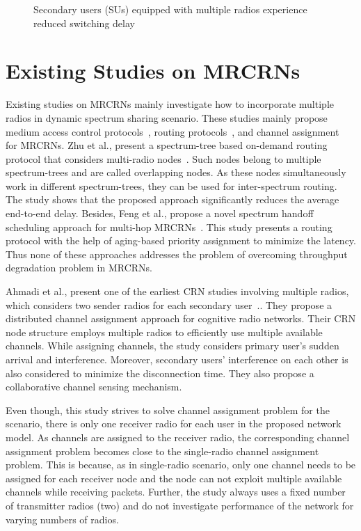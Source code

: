 \begin{figure}[!htbp]
\begin{center}
    
    \caption{Secondary users (SUs) equipped with multiple radios experience reduced switching delay}
    \label{fig:switchingDelay}
\end{center}
\end{figure}


\section{Existing Studies on MRCRNs}
Existing studies on MRCRNs mainly investigate how to incorporate multiple radios in dynamic spectrum sharing scenario. These studies mainly propose medium access control protocols~\cite{cormio2009survey, de2012survey}, routing protocols~\cite{zhu2008stod, feng2009joint}, and channel assignment~\cite{ahmadi2012distributed, zhong2014capacity} for MRCRNs. Zhu et al., present a spectrum-tree based on-demand routing protocol that considers multi-radio nodes~\cite{zhu2008stod}. Such nodes belong to multiple spectrum-trees and are called overlapping nodes. As these nodes simultaneously work in different spectrum-trees, they can be used for inter-spectrum routing. The study shows that the proposed approach significantly reduces the average end-to-end delay.  Besides, Feng et al., propose a novel spectrum handoff scheduling approach for multi-hop MRCRNs~\cite{feng2009joint}. This study presents a routing protocol with the help of aging-based priority assignment to minimize the latency. Thus none of these approaches addresses the problem of overcoming throughput degradation problem in MRCRNs.

Ahmadi et al., present one of the earliest CRN studies involving multiple radios, which considers two sender radios for each secondary user~\cite{ahmadi2012distributed}.. They propose a distributed channel assignment approach for cognitive radio networks. Their CRN node structure employs multiple radios to efficiently use multiple available channels. While assigning channels, the study considers primary user's sudden arrival and interference. Moreover, secondary users' interference on each other is also considered to minimize the disconnection time. They also propose a collaborative channel sensing mechanism.

Even though, this study strives to solve channel assignment problem for the scenario, there is only one receiver radio for each user in the proposed network model. As channels are assigned to the receiver radio, the corresponding channel assignment problem becomes close to the single-radio channel assignment problem. This is because, as in single-radio scenario, only one channel needs to be assigned for each receiver node and the node can not exploit multiple available channels while receiving packets. Further, the study always uses a fixed number of transmitter radios (two) and do not investigate performance of the network for varying numbers of radios.

